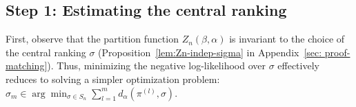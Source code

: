 \documentclass{article}
\begin{document}


\subsection{Step 1: Estimating the central ranking}

First, observe that the partition function \(Z_n(\beta, \alpha)\) is invariant to the choice of the central ranking \(\sigma\) (Proposition~\ref{lem:Zn-indep-sigma} in Appendix~\ref{sec: proof-matching}). Thus, minimizing the negative log-likelihood over $\sigma$ effectively reduces to solving a simpler optimization problem:
$\hat{\sigma}_m \in \arg\min_{\sigma \in {S_n}} \sum_{l=1}^m d_\alpha(\pi^{(l)}, \sigma).$
\end{document}
